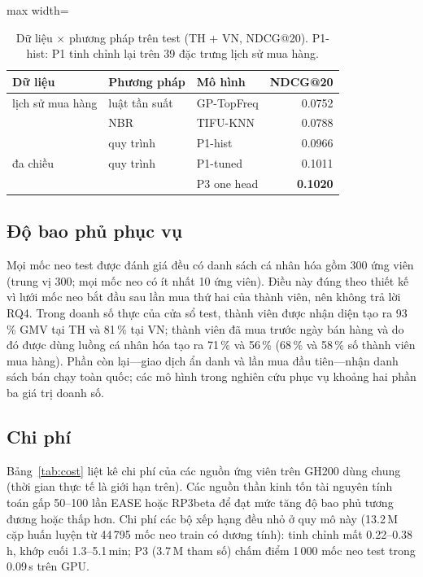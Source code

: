\documentclass[jtehm]{ieeeaccess}
\begin{document}
\begin{table}[t]
\caption{Dữ liệu $\times$ phương pháp trên test (TH + VN, NDCG@20). P1-hist: P1 tinh chỉnh lại trên 39 đặc trưng lịch sử mua hàng.}
\label{tab:hist}
\setlength{\tabcolsep}{3pt}
\centering
\begin{adjustbox}{max width=\columnwidth}
\begin{tabular}{lllr}
\toprule
Dữ liệu & Phương pháp & Mô hình & NDCG@20 \\
\midrule
lịch sử mua hàng & luật tần suất & GP-TopFreq & 0.0752 \\
                 & NBR            & TIFU-KNN   & 0.0788 \\
                 & quy trình       & P1-hist    & 0.0966 \\
\midrule
đa chiều & quy trình      & P1-tuned    & 0.1011 \\
                  &               & P3 one head & \textbf{0.1020} \\
\bottomrule
\end{tabular}
\end{adjustbox}
\end{table}

\subsection{Độ bao phủ phục vụ}
Mọi mốc neo test được đánh giá đều có danh sách cá nhân hóa gồm 300 ứng viên (trung vị 300; mọi mốc neo có ít nhất 10 ứng viên). Điều này đúng theo thiết kế vì lưới mốc neo bắt đầu sau lần mua thứ hai của thành viên, nên không trả lời RQ4. Trong doanh số thực của cửa sổ test, thành viên được nhận diện tạo ra 93\,\% GMV tại TH và 81\,\% tại VN; thành viên đã mua trước ngày bán hàng và do đó được dùng luồng cá nhân hóa tạo ra 71\,\% và 56\,\% (68\,\% và 58\,\% số thành viên mua hàng). Phần còn lại—giao dịch ẩn danh và lần mua đầu tiên—nhận danh sách bán chạy toàn quốc; các mô hình trong nghiên cứu phục vụ khoảng hai phần ba giá trị doanh số.

\subsection{Chi phí}
Bảng~\ref{tab:cost} liệt kê chi phí của các nguồn ứng viên trên GH200 dùng chung (thời gian thực tế là giới hạn trên). Các nguồn thần kinh tốn tài nguyên tính toán gấp 50--100 lần EASE hoặc RP3beta để đạt mức tăng độ bao phủ tương đương hoặc thấp hơn. Chi phí các bộ xếp hạng đều nhỏ ở quy mô này (13.2\,M cặp huấn luyện từ 44\,795 mốc neo train có dương tính): tinh chỉnh mất 0.22--0.38\,h, khớp cuối 1.3--5.1\,min; P3 (3.7\,M tham số) chấm điểm 1\,000 mốc neo test trong 0.09\,s trên GPU.
\end{document}
